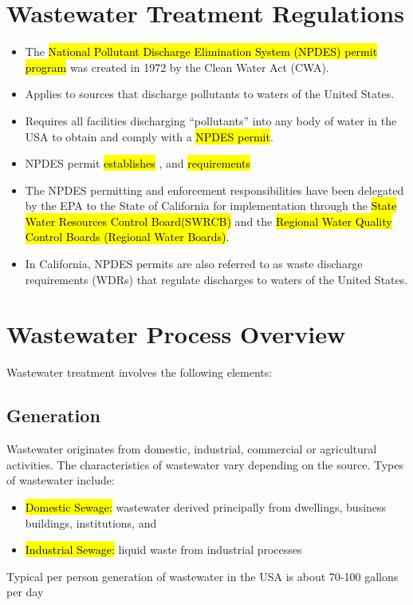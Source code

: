 \section{Wastewater Treatment Regulations}

\begin{itemize}
\item The \hl{National Pollutant Discharge Elimination System (NPDES) permit program} was created in 1972 by the Clean Water Act (CWA).
\item Applies to sources that discharge pollutants to waters of the United States.
\item Requires all facilities discharging “pollutants” into any body of water in the USA to obtain and comply with a \hl{NPDES permit}.
\item NPDES permit \hl{establishes} ,  and  \hl{requirements}\\
\item The NPDES permitting and enforcement responsibilities have been delegated by the EPA to the State of California for implementation through the \hl{State Water Resources Control Board(SWRCB)} and the  \hl{Regional Water Quality Control Boards (Regional Water Boards)}.
\item In California, NPDES permits are also referred to as waste discharge requirements (WDRs) that regulate discharges to waters of the United States.
\end{itemize}


\section{Wastewater Process Overview}
Wastewater treatment involves the following elements:

\subsection{Generation}

Wastewater originates from domestic, industrial, commercial or agricultural activities. The characteristics of wastewater vary depending on the source. Types of wastewater include: 
\begin{itemize}
\item \hl{Domestic Sewage:}  wastewater derived principally from dwellings, business buildings, institutions, and \\
\item \hl{Industrial Sewage:}  liquid waste from industrial processes\\
\end{itemize}
Typical per person generation of wastewater in the USA is about 70-100 gallons per day

